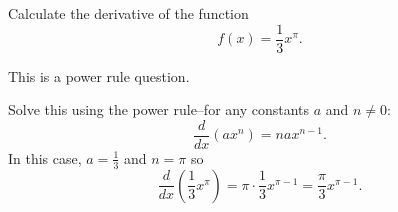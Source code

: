 \documentclass{ximera}
\author{Emma Smith Zbarsky}
\begin{document}
\begin{exercise}

Calculate the derivative of the function \[f(x) = \frac{1}{3}x^{\pi}.\]


\begin{hint}
This is a power rule question.
\end{hint}


\begin{hint}
Solve this using the power rule--for any constants $a$ and $n \neq 0$:
\[\frac{d}{dx}\left(ax^n\right) = nax^{n-1}.\] In this case,
$a=\frac{1}{3}$ and $n=\pi$ so
\[\frac{d}{dx}\left(\frac{1}{3}x^{\pi}\right) = \pi\cdot \frac{1}{3} x^{\pi-1} = \boxed{\frac{\pi}{3}x^{\pi-1}}.\]
\end{hint}


\begin{multipleChoice}
\end{multipleChoice}

\end{exercise}
\end{document}
